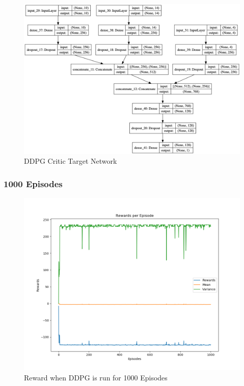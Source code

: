 \documentclass[doc, onecolumn, 12pt]{apa6}
\begin{document}
\begin{figure}
\label{DDPG_CriticTarget}
\includegraphics[width=\textwidth]{results/ddpg/DDPG_critictg.png}
\caption{DDPG Critic Target Network}
\end{figure}



\FloatBarrier
\subsubsection{1000 Episodes}

\begin{figure}
\label{DDPG_1000Ep_Rewards}
\includegraphics[width =\textwidth, height=0.4 \textheight]{results/ddpg/1000_ep/Rewards.png}
\caption{Reward when DDPG is run for 1000 Episodes}
\end{figure}
\end{document}
